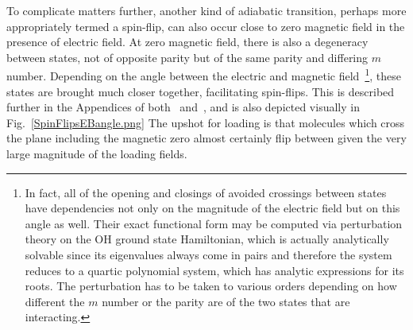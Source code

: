 To complicate matters further, another kind of adiabatic transition, perhaps more appropriately termed a spin-flip, can also occur close to zero magnetic field in the presence of electric field.
At zero magnetic field, there is also a degeneracy between states, not of opposite parity but of the same parity and differing $m$ number.
Depending on the angle between the electric and magnetic field~\footnote{In fact, all of the opening and closings of avoided crossings between states have dependencies not only on the magnitude of the electric field but on this angle as well. Their exact functional form may be computed via perturbation theory on the OH ground state Hamiltonian, which is actually analytically solvable since its eigenvalues always come in pairs and therefore the system reduces to a quartic polynomial system, which has analytic expressions for its roots. The perturbation has to be taken to various orders depending on how different the $m$ number or the parity are of the two states that are interacting.}, these states are brought much closer together, facilitating spin-flips.
This is described further in the Appendices of both~\cite{Stuhl2013} and~\citep[App.~A]{Reens2017}, and is also depicted visually in Fig.~\ref{SpinFlipsEBangle.png}
The upshot for loading is that molecules which cross the plane including the magnetic zero almost certainly flip between  given the very large magnitude of the loading fields.


